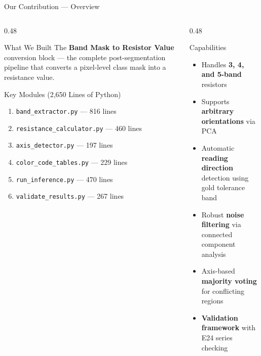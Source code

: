 \documentclass[aspectratio=169, 11pt]{beamer}
\newenvironment{compactitemize}{%
  \begin{itemize}\setlength{\itemsep}{1pt}\setlength{\parskip}{0pt}\setlength{\parsep}{0pt}%
}{\end{itemize}}
\newenvironment{compactenum}{%
  \begin{enumerate}\setlength{\itemsep}{1pt}\setlength{\parskip}{0pt}\setlength{\parsep}{0pt}%
}{\end{enumerate}}
\begin{document}
\begin{frame}{Our Contribution --- Overview}
\small
\begin{columns}[T]
\begin{column}{0.48\textwidth}
\begin{block}{What We Built}
\small
The \textbf{Band Mask to Resistor Value} conversion block --- the complete post-segmentation pipeline that converts a pixel-level class mask into a resistance value.
\end{block}

\vspace{0.1cm}
\begin{exampleblock}{Key Modules (2,650 Lines of Python)}
\small
\begin{compactenum}
  \item \texttt{band\_extractor.py} --- 816 lines
  \item \texttt{resistance\_calculator.py} --- 460 lines
  \item \texttt{axis\_detector.py} --- 197 lines
  \item \texttt{color\_code\_tables.py} --- 229 lines
  \item \texttt{run\_inference.py} --- 470 lines
  \item \texttt{validate\_results.py} --- 267 lines
\end{compactenum}
\end{exampleblock}
\end{column}
\begin{column}{0.48\textwidth}
\begin{block}{Capabilities}
\small
\begin{compactitemize}
  \item Handles \textbf{3, 4, and 5-band} resistors
  \item Supports \textbf{arbitrary orientations} via PCA
  \item Automatic \textbf{reading direction} detection using gold tolerance band
  \item Robust \textbf{noise filtering} via connected component analysis
  \item Axis-based \textbf{majority voting} for conflicting regions
  \item \textbf{Validation framework} with E24 series checking
\end{compactitemize}
\end{block}
\end{column}
\end{columns}
\end{frame}
\end{document}
